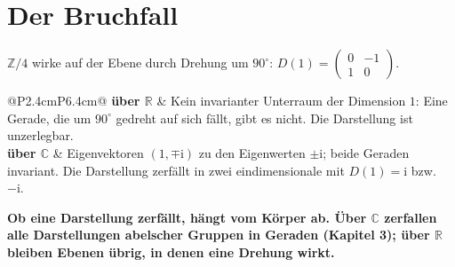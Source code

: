 \section{Der Bruchfall}

\begin{warnung}
$\mathbb Z/4$ wirke auf der Ebene durch Drehung um $90^{\circ}$: $D(1) = \begin{pmatrix}0 & -1\\ 1 & 0\end{pmatrix}$.
\begin{center}
{\small
\renewcommand{\arraystretch}{1.5}
\begin{tabular}{@{}P{2.4cm}P{6.4cm}@{}}
\toprule
\textbf{über $\mathbb R$} & Kein invarianter Unterraum der Dimension $1$: Eine Gerade, die um $90^{\circ}$ gedreht auf sich fällt, gibt es nicht. Die Darstellung ist unzerlegbar.\\
\textbf{über $\mathbb C$} & Eigenvektoren $(1, \mp\mathrm i)$ zu den Eigenwerten $\pm\mathrm i$; beide Geraden invariant. Die Darstellung zerfällt in zwei eindimensionale mit $D(1) = \mathrm i$ bzw.\ $-\mathrm i$.\\
\bottomrule
\end{tabular}}
\end{center}

\begin{center}
\begin{minipage}{0.9\textwidth}
\textbf{Ob eine Darstellung zerfällt, hängt vom Körper ab. Über $\mathbb C$ zerfallen alle Darstellungen abelscher Gruppen in Geraden (Kapitel 3); über $\mathbb R$ bleiben Ebenen übrig, in denen eine Drehung wirkt.}
\end{minipage}
\end{center}

\begin{center}
\begin{minipage}{0.88\textwidth}
\end{minipage}
\end{center}
\end{warnung}


